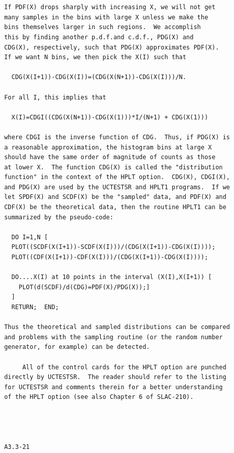 \newpage {} \begin{verbatim}
 
 
 If PDF(X) drops sharply with increasing X, we will not get
 many samples in the bins with large X unless we make the
 bins themselves larger in such regions.  We accomplish
 this by finding another p.d.f.and c.d.f., PDG(X) and
 CDG(X), respectively, such that PDG(X) approximates PDF(X).
 If we want N bins, we then pick the X(I) such that
 
   CDG(X(I+1))-CDG(X(I))=(CDG(X(N+1))-CDG(X(I)))/N.
 
 For all I, this implies that
 
   X(I)=CDGI((CDG(X(N+1))-CDG(X(1)))*I/(N+1) + CDG(X(1)))
 
 where CDGI is the inverse function of CDG.  Thus, if PDG(X) is
 a reasonable approximation, the histogram bins at large X
 should have the same order of magnitude of counts as those
 at lower X.  The function CDG(X) is called the "distribution
 function" in the context of the HPLT option.  CDG(X), CDGI(X),
 and PDG(X) are used by the UCTESTSR and HPLT1 programs.  If we
 let SPDF(X) and SCDF(X) be the "sampled" data, and PDF(X) and
 CDF(X) be the theoretical data, then the routine HPLT1 can be
 summarized by the pseudo-code:
 
   DO I=1,N [
   PLOT((SCDF(X(I+1))-SCDF(X(I)))/(CDG(X(I+1))-CDG(X(I))));
   PLOT((CDF(X(I+1))-CDF(X(I)))/(CDG(X(I+1))-CDG(X(I))));
 
   DO....X(I) at 10 points in the interval (X(I),X(I+1)) [
     PLOT(d(SCDF)/d(CDG)=PDF(X)/PDG(X));]
   ]
   RETURN;  END;
 
 Thus the theoretical and sampled distributions can be compared
 and problems with the sampling routine (or the random number
 generator, for example) can be detected.
 
      All of the control cards for the HPLT option are punched
 directly by UCTESTSR.  The reader should refer to the listing
 for UCTESTSR and comments therein for a better understanding
 of the HPLT option (see also Chapter 6 of SLAC-210).
 
 
 
 
 A3.3-21 
\end{verbatim} 
